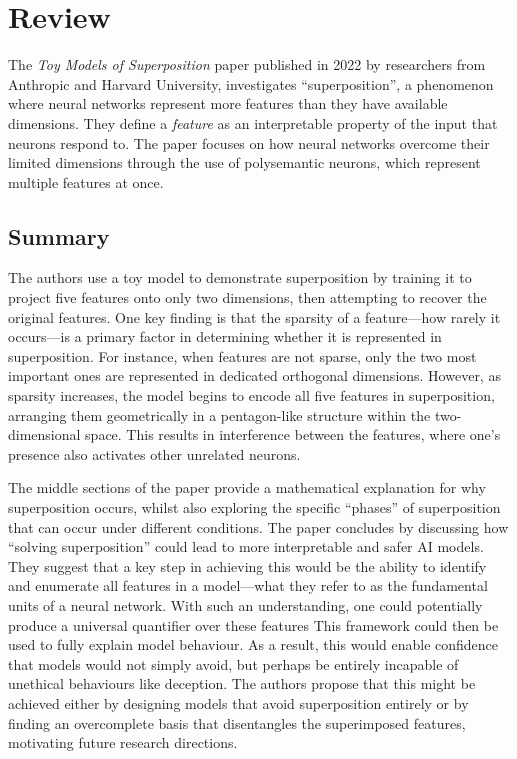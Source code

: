 \section{Review}
\label{sec:review}

The \textit{Toy Models of Superposition} paper \cite{elhage2022toy} published in 2022 by researchers from Anthropic and Harvard University, investigates ``superposition'', a phenomenon where neural networks represent more features than they have available dimensions.
They define a \textit{feature} as an interpretable property of the input that neurons respond to.
The paper focuses on how neural networks overcome their limited dimensions through the use of polysemantic neurons, which represent multiple features at once.


\subsection{Summary}

The authors use a toy model to demonstrate superposition by training it to project five features onto only two dimensions, then attempting to recover the original features.
One key finding is that the sparsity of a feature—how rarely it occurs—is a primary factor in determining whether it is represented in superposition. For instance, when features are not sparse, only the two most important ones are represented in dedicated orthogonal dimensions.
However, as sparsity increases, the model begins to encode all five features in superposition, arranging them geometrically in a pentagon-like structure within the two-dimensional space.
This results in interference between the features, where one's presence also activates other unrelated neurons.

The middle sections of the paper provide a mathematical explanation for why superposition occurs, whilst also exploring the specific ``phases'' of superposition that can occur under different conditions.
The paper concludes by discussing how ``solving superposition'' could lead to more interpretable and safer AI models.
They suggest that a key step in achieving this would be the ability to identify and enumerate all features in a model—what they refer to as the fundamental units of a neural network.
With such an understanding, one could potentially produce a universal quantifier over these features
This framework could then be used to fully explain model behaviour.
As a result, this would enable confidence that models would not simply avoid, but perhaps be entirely incapable of unethical behaviours like deception.
The authors propose that this might be achieved either by designing models that avoid superposition entirely or by finding an overcomplete basis that disentangles the superimposed features, motivating future research directions.

